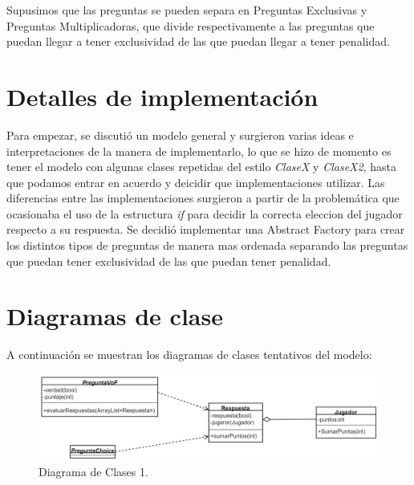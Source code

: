 \documentclass[titlepage,a4paper]{article}
\begin{document}
Supusimos que las preguntas se pueden separa en Preguntas Exclusivas y Preguntas Multiplicadoras, que divide respectivamente a las preguntas que puedan llegar a tener exclusividad de las que puedan llegar a tener penalidad. 


\section{Detalles de implementación}\label{sec:implementacion}

Para empezar, se discutió un modelo general y surgieron varias ideas e interpretaciones de la manera de implementarlo, lo que se hizo de momento es tener el modelo con algunas clases repetidas del estilo \textit{ClaseX} y \textit{ClaseX2}, hasta que podamos entrar en acuerdo y deicidir que implementaciones utilizar.
Las diferencias entre las implementaciones surgieron a partir de la problemática que ocasionaba el uso de la estructura \textit{if} para decidir la correcta eleccion del jugador respecto a su respuesta.
Se decidió implementar una Abstract Factory para crear los distintos tipos de preguntas de manera mas ordenada separando las preguntas que puedan tener exclusividad de las que puedan tener penalidad.


\section{Diagramas de clase}\label{sec:diagramasdeclase}

A continuación se muestran los diagramas de clases tentativos del modelo:

\begin{figure}[H]
\centering
\includegraphics[width=1.3\textwidth, center]{Diagrama de clases 3.png}
\caption{\label{fig:class01}Diagrama de Clases 1.}
\end{figure}
\end{document}

